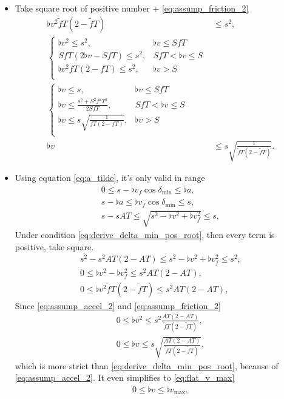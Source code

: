 \begin{itemize}
\item
Take square root of positive number + \eqref{eq:assump_friction_2}
\begin{align}
\nonumber
\flat{v}^2 \tilde{f}T (2 - \tilde{f}T) &\le s^2,\\
\nonumber
\begin{cases}
\flat{v}^2 \le s^2, &\flat{v} \le S fT\\
S fT (2 \flat{v} - S fT) \le s^2, &S fT < \flat{v} \le S\\
\flat{v}^2 fT (2 - fT) \le s^2, &\flat{v} > S\\
\end{cases}\\
\nonumber
\begin{cases}
\flat{v} \le s, &\flat{v} \le S fT\\
\flat{v} \le \frac{s^2 + S^2 f^2 T^2}{2 S fT}, &S fT < \flat{v} \le S\\
\flat{v} \le s \sqrt{\frac{1}{fT (2 - fT)}}, &\flat{v} > S\\
\end{cases}\\
\label{eq:derive_delta_min_pos_root}
\flat{v} &\le s\sqrt{\frac{1}{\tilde{f}T (2 - \tilde{f}T)}}.
\end{align}

\item
Using equation \eqref{eq:a_tilde}, it's only valid in range
\begin{align*}
0 \le s - \flat{v}_f \cos\delta_{\min} \le \flat{a},\\
s - \flat{a} \le \flat{v}_f \cos\delta_{\min} \le s,\\
s - sAT \le \sqrt{s^2 - \flat{v}^2 + \flat{v}_f^2} \le s,
\end{align*}
Under condition \eqref{eq:derive_delta_min_pos_root}, then every term is positive, take square.
\begin{align*}
s^2 - s^2 AT(2 - AT) \le s^2 - \flat{v}^2 + \flat{v}_f^2 \le s^2,\\
0 \le \flat{v}^2 - \flat{v}_f^2 \le s^2 AT(2 - AT),\\
0 \le \flat{v}^2 \tilde{f}T(2 - \tilde{f}T) \le s^2 AT(2 - AT),
\end{align*}
Since \eqref{eq:assump_accel_2} and \eqref{eq:assump_friction_2}
\begin{align}
\nonumber
0 \le \flat{v}^2 \le s^2 \frac{AT(2 - AT)}{\tilde{f}T(2 - \tilde{f}T)},\\
\label{eq:delta_min_constraint}
0 \le \flat{v} \le s\sqrt{\frac{AT(2 - AT)}{\tilde{f}T(2 - \tilde{f}T)}},
\end{align}
which is more strict than \eqref{eq:derive_delta_min_pos_root}, because of \eqref{eq:assump_accel_2}. It even simplifies to \eqref{eq:flat_v_max}
\begin{align}
0 \le \flat{v} \le \flat{v}_{\max},
\end{align}


\end{itemize}
